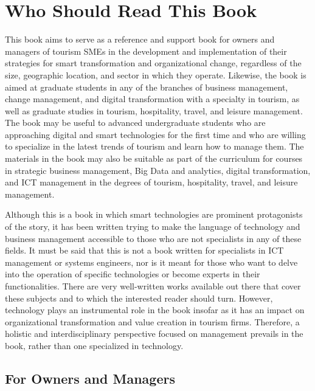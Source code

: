 \documentclass[
  letterpaper,
  DIV=11,
  numbers=noendperiod]{scrreprt}
\begin{document}
\hypertarget{who-should-read-this-book}{%
\chapter{Who Should Read This Book}\label{who-should-read-this-book}}

This book aims to serve as a reference and support book for owners and
managers of tourism SMEs in the development and implementation of their
strategies for smart transformation and organizational change,
regardless of the size, geographic location, and sector in which they
operate. Likewise, the book is aimed at graduate students in any of the
branches of business management, change management, and digital
transformation with a specialty in tourism, as well as graduate studies
in tourism, hospitality, travel, and leisure management. The book may be
useful to advanced undergraduate students who are approaching digital
and smart technologies for the first time and who are willing to
specialize in the latest trends of tourism and learn how to manage them.
The materials in the book may also be suitable as part of the curriculum
for courses in strategic business management, Big Data and analytics,
digital transformation, and ICT management in the degrees of tourism,
hospitality, travel, and leisure management.

Although this is a book in which smart technologies are prominent
protagonists of the story, it has been written trying to make the
language of technology and business management accessible to those who
are not specialists in any of these fields. It must be said that this is
not a book written for specialists in ICT management or systems
engineers, nor is it meant for those who want to delve into the
operation of specific technologies or become experts in their
functionalities. There are very well-written works available out there
that cover these subjects and to which the interested reader should
turn. However, technology plays an instrumental role in the book insofar
as it has an impact on organizational transformation and value creation
in tourism firms. Therefore, a holistic and interdisciplinary
perspective focused on management prevails in the book, rather than one
specialized in technology.

\hypertarget{for-owners-and-managers}{%
\section{For Owners and Managers}\label{for-owners-and-managers}}
\end{document}
